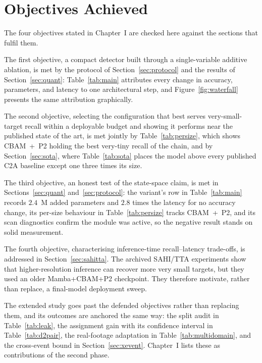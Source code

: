 \section{Objectives Achieved}
\label{sec:objectives}
The four objectives stated in Chapter~I are checked here against the sections
that fulfil them.

The first objective, a compact detector built through a single-variable
additive ablation, is met by the protocol of Section~\ref{sec:protocol} and
the results of Section~\ref{sec:quant}: Table~\ref{tab:main} attributes every
change in accuracy, parameters, and latency to one architectural step, and
Figure~\ref{fig:waterfall} presents the same attribution graphically.

The second objective, selecting the configuration that best serves
very-small-target recall within a deployable budget and showing it performs
near the published state of the art, is met jointly by
Table~\ref{tab:persize}, which shows CBAM~+~P2 holding the best very-tiny
recall of the chain, and by Section~\ref{sec:sota}, where
Table~\ref{tab:sota} places the model above every published C2A baseline
except one three times its size.

The third objective, an honest test of the state-space claim, is met in
Sections~\ref{sec:quant} and~\ref{sec:protocol}: the variant's row in
Table~\ref{tab:main} records $2.4$~M added parameters and $2.8$ times the
latency for no accuracy change, its per-size behaviour in
Table~\ref{tab:persize} tracks CBAM~+~P2, and its scan diagnostics confirm
the module was active, so the negative result stands on solid measurement.

The fourth objective, characterising inference-time recall--latency trade-offs,
is addressed in Section~\ref{sec:sahitta}. The archived SAHI/TTA experiments
show that higher-resolution inference can recover more very small targets, but
they used an older Mamba+CBAM+P2 checkpoint. They therefore motivate, rather
than replace, a final-model deployment sweep.

The extended study goes past the defended objectives rather than replacing
them, and its outcomes are anchored the same way: the split audit in
Table~\ref{tab:leak}, the assignment gain with its confidence interval in
Table~\ref{tab:d2pair}, the real-footage adaptation in
Table~\ref{tab:multidomain}, and the cross-event bound in
Section~\ref{sec:xevent}. Chapter~I lists these as contributions of the
second phase.

